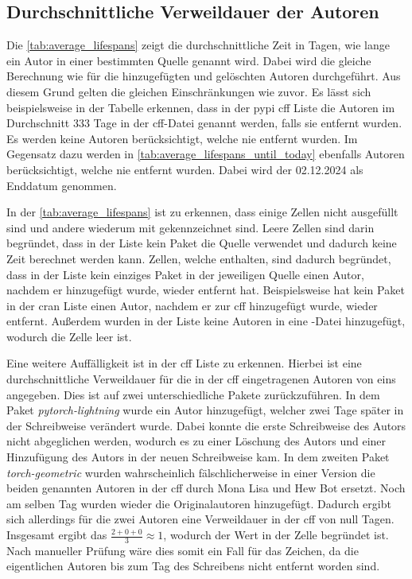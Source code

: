 \subsection*{Durchschnittliche Verweildauer der Autoren}
Die \autoref{tab:average_lifespans} zeigt die durchschnittliche Zeit in Tagen, wie lange ein Autor in einer bestimmten Quelle genannt wird.
Dabei wird die gleiche Berechnung wie für die hinzugefügten und gelöschten Autoren durchgeführt.
Aus diesem Grund gelten die gleichen Einschränkungen wie zuvor.
Es lässt sich beispielsweise in der Tabelle erkennen, dass in der \gls{pypi} \gls{cff} Liste die Autoren im Durchschnitt 333 Tage in der \gls{cff}-Datei genannt werden, falls sie entfernt wurden.
Es werden keine Autoren berücksichtigt, welche nie entfernt wurden.
Im Gegensatz dazu werden in \autoref{tab:average_lifespans_until_today} ebenfalls Autoren berücksichtigt, welche nie entfernt wurden. Dabei wird der 02.12.2024 als Enddatum genommen.

In der \autoref{tab:average_lifespans} ist zu erkennen, dass einige Zellen nicht ausgefüllt sind und andere wiederum mit \infty{} gekennzeichnet sind.
Leere Zellen sind darin begründet, dass in der Liste kein Paket die Quelle verwendet und dadurch keine Zeit berechnet werden kann.
Zellen, welche \infty{} enthalten, sind dadurch begründet, dass in der Liste kein einziges Paket in der jeweiligen Quelle einen Autor, nachdem er hinzugefügt wurde, wieder entfernt hat.
Beispielsweise hat kein Paket in der \gls{cran} Liste einen Autor, nachdem er zur \gls{cff} hinzugefügt wurde, wieder entfernt.
Außerdem wurden in der Liste keine Autoren in eine -Datei hinzugefügt, wodurch die Zelle leer ist.

Eine weitere Auffälligkeit ist in der \gls{cff} Liste zu erkennen.
Hierbei ist eine durchschnittliche Verweildauer für die in der \gls{cff} eingetragenen Autoren von eins angegeben.
Dies ist auf zwei unterschiedliche Pakete zurückzuführen.
In dem Paket \emph{pytorch-lightning} wurde ein Autor hinzugefügt, welcher zwei Tage später in der Schreibweise verändert wurde.
Dabei konnte die erste Schreibweise des Autors nicht abgeglichen werden, wodurch es zu einer Löschung des Autors und einer Hinzufügung des Autors in der neuen Schreibweise kam.
In dem zweiten Paket \emph{torch-geometric} wurden wahrscheinlich fälschlicherweise in einer Version die beiden genannten Autoren in der \gls{cff} durch \glqq Mona Lisa\grqq{} und \glqq Hew Bot\grqq{} ersetzt.
Noch am selben Tag wurden wieder die Originalautoren hinzugefügt.
Dadurch ergibt sich allerdings für die zwei Autoren eine Verweildauer in der \gls{cff} von null Tagen.
Insgesamt ergibt das $\frac{2+0+0}{3}\approx1$, wodurch der Wert in der Zelle begründet ist.
Nach manueller Prüfung wäre dies somit ein Fall für das \infty{} Zeichen, da die eigentlichen Autoren bis zum Tag des Schreibens nicht entfernt worden sind.

